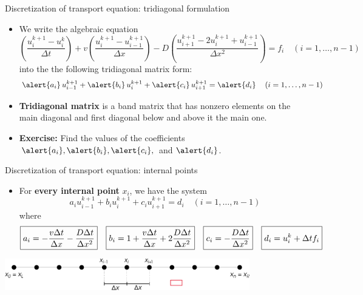 \begin{frame}{Discretization of transport equation: tridiagonal formulation}
\begin{itemize}
\item We write the algebraic equation
\[
\left(\frac{u_{i}^{k+1}-u_{i}^{k}}{\Delta t}\right)+v\left(\frac{u_{i}^{k+1}-u_{i-1}^{k+1}}{\Delta x}\right)-D\left(\frac{u_{i+1}^{k+1}-2u_{i}^{k+1}+u_{i-1}^{k+1}}{\Delta x^{2}}\right)=f_{i}\quad(i=1,\ldots,n-1)
\]
into the the following tridiagonal matrix form:
\[
\alert{a_{i}}\, u_{i-1}^{k+1}+
\alert{b_{i}}\, u_{i}^{k+1}+
\alert{c_{i}}\, u_{i+1}^{k+1}=
\alert{d_{i}}\, \quad(i=1,\ldots,n-1)
\]
\item \alert{\bf Tridiagonal matrix} is a band matrix that has nonzero elements on the main diagonal and first diagonal below and above it the main one.
%
\item \alert{\bf Exercise: } Find the values of the coefficients
$\alert{a_{i}}, \alert{b_{i}}, \alert{c_{i}},$ and $\alert{d_{i}}$.
\hiddenpause
\end{itemize}

\end{frame}
%
%
\begin{frame}{Discretization of transport equation: internal points}

\begin{itemize}
\item For \alert{\bf every internal point} $x_{i}$, we have the system
\[
a_{i}u_{i-1}^{k+1}+b_{i}u_{i}^{k+1}+c_{i}u_{i+1}^{k+1}=d_{i}\quad(i=1,\ldots,n-1)
\]
where
\[
\boxed{a_{i}=-\frac{v\Delta t}{\Delta x}-\frac{D\Delta t}{\Delta x^{2}}}\quad\boxed{b_{i}=1+\frac{v\Delta t}{\Delta x}+2\frac{D\Delta t}{\Delta x^{2}}}\quad\boxed{c_{i}=-\frac{D\Delta t}{\Delta x^{2}}}\quad\boxed{d_{i}=u_{i}^{k}+\Delta tf_{i}\vphantom{\frac{D\Delta t}{\Delta x^{2}}}}
\]
\end{itemize}
\vskip 10pt
\begin{center}
	\includegraphics[width=0.8\textwidth]{figures/reactive-transport/finite-difference-domain-discretization}
\par\end{center}
\end{frame}
